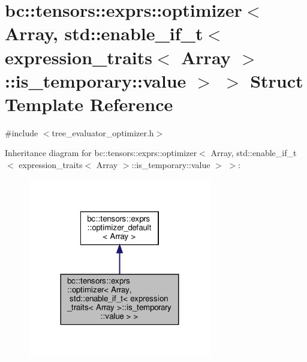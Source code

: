 \hypertarget{structbc_1_1tensors_1_1exprs_1_1optimizer_3_01Array_00_01std_1_1enable__if__t_3_01expression__tr6f024f979d44d7dd29d94a5b5f9e889b}{}\section{bc\+:\+:tensors\+:\+:exprs\+:\+:optimizer$<$ Array, std\+:\+:enable\+\_\+if\+\_\+t$<$ expression\+\_\+traits$<$ Array $>$\+:\+:is\+\_\+temporary\+:\+:value $>$ $>$ Struct Template Reference}
\label{structbc_1_1tensors_1_1exprs_1_1optimizer_3_01Array_00_01std_1_1enable__if__t_3_01expression__tr6f024f979d44d7dd29d94a5b5f9e889b}


{\ttfamily \#include $<$tree\+\_\+evaluator\+\_\+optimizer.\+h$>$}



Inheritance diagram for bc\+:\+:tensors\+:\+:exprs\+:\+:optimizer$<$ Array, std\+:\+:enable\+\_\+if\+\_\+t$<$ expression\+\_\+traits$<$ Array $>$\+:\+:is\+\_\+temporary\+:\+:value $>$ $>$\+:\nopagebreak
\begin{figure}[H]
\begin{center}
\leavevmode
\includegraphics[width=227pt]{structbc_1_1tensors_1_1exprs_1_1optimizer_3_01Array_00_01std_1_1enable__if__t_3_01expression__tr5d3a340d38d35a5084ecd499b360630b}
\end{center}
\end{figure}


